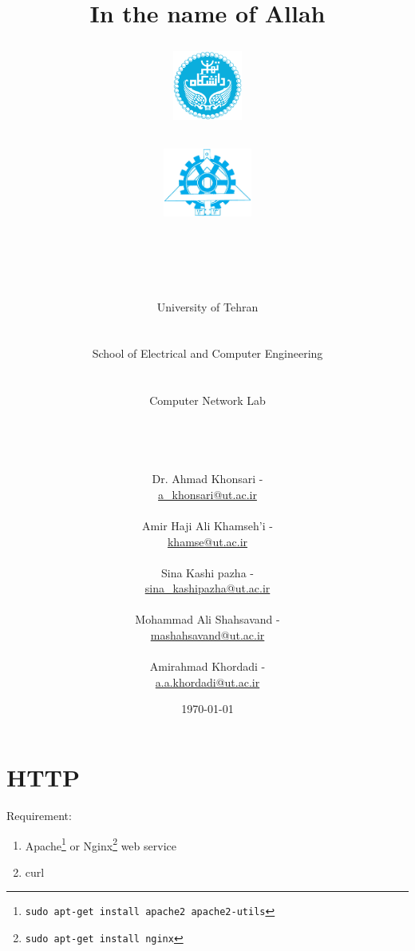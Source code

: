 \documentclass[10pt,a4paper]{article}
\title{
\normalsize In the name of Allah\\
\vspace{10pt}
\LARGE\FR{بسم \allah الرحمن الرحیم}
\vspace{10pt}
\begin{center}
    \begin{minipage}{0.48\textwidth}
        \begin{flushleft}
            \includegraphics[height=64pt,width=64pt]{../img/logo.png}
        \end{flushleft}
    \end{minipage}
    \begin{minipage}{0.48\textwidth}
        \begin{flushright}
            \includegraphics[height=64pt]{../img/eng-logo.png}
        \end{flushright}
    \end{minipage}
\end{center}
\vspace*{-64pt}
\huge \titleText\\
\vspace{40pt}
}
\author{
\huge University of Tehran\\
\LARGE \FR{دانشگاه تهران}\\
\\
\LARGE School of Electrical and Computer Engineering\\
\FR{دانشکده مهندسی برق و کامپیوتر}\\
\\
\Large Computer Network Lab\\
\FR{آزمایشگاه شبکه‌های کامپیوتری}\\
\\
\\
\\
\normalfont
Dr. Ahmad Khonsari - \FR{احمد خونساری}\\
\href{mailto:a_khonsari@ut.ac.ir}{a\_khonsari@ut.ac.ir}\\
\\
\normalsize
Amir Haji Ali Khamseh'i - \FR{امیر حاجی علی خمسه‌ء}\\
\href{mailto:khamse@ut.ac.ir}{khamse@ut.ac.ir}\\
\\
\normalsize
Sina Kashi pazha - \FR{سینا کاشی پزها}\\
\href{mailto:sina\_kashipazha@ut.ac.ir}{sina\_kashipazha@ut.ac.ir}\\
\\
\normalsize
Mohammad Ali Shahsavand - \FR{محمد علی شاهسوند}\\
\href{mailto:mashahsavand@ut.ac.ir}{mashahsavand@ut.ac.ir}\\
\\
\normalsize
Amirahmad Khordadi - \FR{امیر احمد خردادی}\\
\href{mailto:a.a.khordadi@ut.ac.ir}{a.a.khordadi@ut.ac.ir}
}
\date{\vspace{30pt}\today\\\vspace{10pt}{\selectlanguage{farsi}\today}}
\numberwithin{equation}{section}
\numberwithin{figure}{section}
\numberwithin{table}{section}
\begin{document}

    \maketitle


    \pagebreak




    \section*{HTTP}
    Requirement:
    \begin{enumerate}
        \item Apache\footnote{\texttt{sudo apt-get install apache2 apache2-utils}} or Nginx\footnote{\texttt{sudo apt-get install nginx}} web service
        \item curl
    \end{enumerate}
\end{document}
